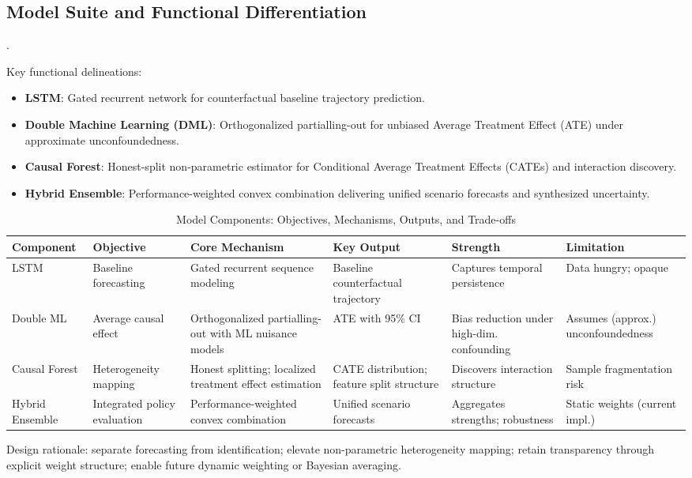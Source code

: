\subsection{Model Suite and Functional Differentiation}
.

Key functional delineations:
\begin{itemize}
  \item \textbf{LSTM}: Gated recurrent network for counterfactual baseline trajectory prediction.
  \item \textbf{Double Machine Learning (DML)}: Orthogonalized partialling-out for unbiased Average Treatment Effect (ATE) under approximate unconfoundedness.
  \item \textbf{Causal Forest}: Honest-split non-parametric estimator for Conditional Average Treatment Effects (CATEs) and interaction discovery.
  \item \textbf{Hybrid Ensemble}: Performance-weighted convex combination delivering unified scenario forecasts and synthesized uncertainty.
\end{itemize}

\begin{table}[H]
\centering
\small
\caption{Model Components: Objectives, Mechanisms, Outputs, and Trade-offs}
\label{tab:model_comparison}
\setlength{\tabcolsep}{4pt}
\renewcommand{\arraystretch}{1.12}
\begin{tabular}{|p{2.2cm}|p{2.3cm}|p{3.0cm}|p{2.5cm}|p{2.3cm}|p{2.4cm}|}
\hline
\textbf{Component} & \textbf{Objective} & \textbf{Core Mechanism} & \textbf{Key Output} & \textbf{Strength} & \textbf{Limitation} \\
\hline
LSTM & Baseline forecasting & Gated recurrent sequence modeling & Baseline counterfactual trajectory & Captures temporal persistence & Data hungry; opaque \\
\hline
Double ML & Average causal effect & Orthogonalized partialling-out with ML nuisance models & ATE with 95\% CI & Bias reduction under high-dim. confounding & Assumes (approx.) unconfoundedness \\
\hline
Causal Forest & Heterogeneity mapping & Honest splitting; localized treatment effect estimation & CATE distribution; feature split structure & Discovers interaction structure & Sample fragmentation risk \\
\hline
Hybrid Ensemble & Integrated policy evaluation & Performance-weighted convex combination & Unified scenario forecasts & Aggregates strengths; robustness & Static weights (current impl.) \\
\hline
\end{tabular}
\end{table}
Design rationale: separate forecasting from identification; elevate non-parametric heterogeneity mapping; retain transparency through explicit weight structure; enable future dynamic weighting or Bayesian averaging.

